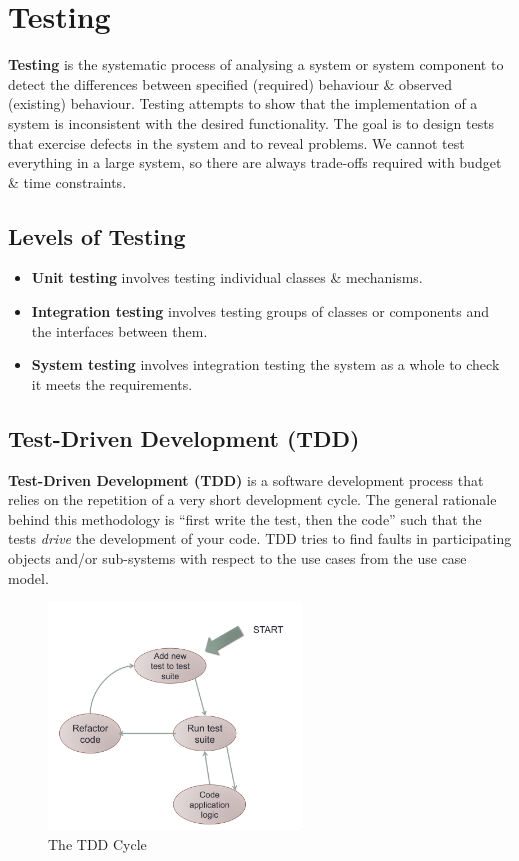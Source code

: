 \documentclass[a4paper,11pt]{article}
\begin{document}
\section{Testing}
\textbf{Testing} is the systematic process of analysing a system or system component to detect the differences between 
specified (required) behaviour \& observed (existing) behaviour. 
Testing attempts to show that the implementation of a system is inconsistent with the desired functionality. 
The goal is to design tests that exercise defects in the system and to reveal problems. 
We cannot test everything in a large system, so there are always trade-offs required with budget \& time constraints.

\subsection{Levels of Testing}
\begin{itemize}
    \item   \textbf{Unit testing} involves testing individual  classes \& mechanisms. 
    \item   \textbf{Integration testing} involves testing groups of classes or components and the interfaces between them. 
    \item   \textbf{System testing} involves integration testing the system as a whole to check it meets the requirements. 
\end{itemize}

\subsection{Test-Driven Development (TDD)}
\textbf{Test-Driven Development (TDD)} is a software development process that relies on the repetition of a very short 
development cycle. 
The general rationale behind this methodology is ``first write the test, then the code'' such that the tests \emph{drive} the 
development of your code. 
TDD tries to find faults in participating objects and/or sub-systems with respect to the use cases from the use case model.
\begin{figure}[H]
    \centering
    \includegraphics[width=0.6\textwidth]{./images/tdd_cycle.png}
    \caption{The TDD Cycle}
\end{figure}
\end{document}
